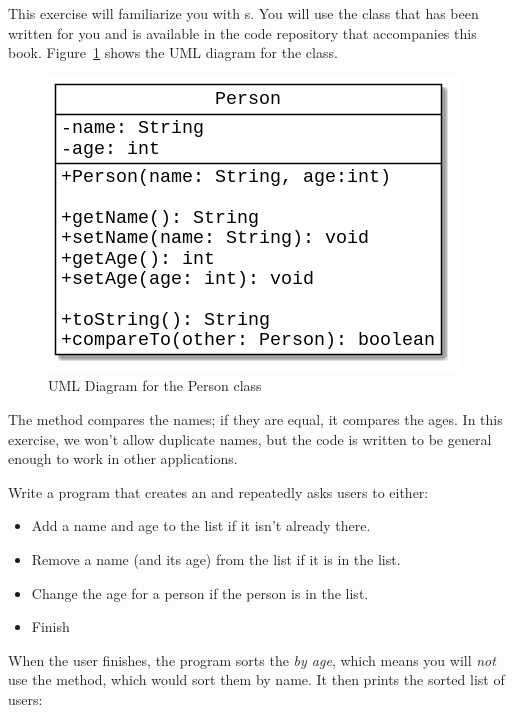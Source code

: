 \begin{exercise}
This exercise will familiarize you with s. You will use the  class that has been written for you and is available in the code repository that accompanies this book. Figure~\ref{fig.personuml} shows the UML diagram for the class.

\begin{figure}[!h]
\begin{center}
\includegraphics[scale=0.5]{figs/ch13/person.png}
\caption{UML Diagram for the Person class}
\label{fig.personuml}
\end{center}
\end{figure}

The  method compares the names; if they are equal, it compares the ages. In this exercise, we won't allow duplicate names, but the code is written to be general enough to work in other applications.

Write a program that creates an  and repeatedly asks users to either:

\begin{itemize}
\item Add a name and age to the list if it isn't already there.
\item Remove a name (and its age) from the list if it is in the list.
\item Change the age for a person if the person is in the list.
\item Finish
\end{itemize}

When the user finishes, the program sorts the  {\em by age}, which means you will {\em not} use the  method, which would sort them by name. It then prints the sorted list of users:


\end{exercise}
